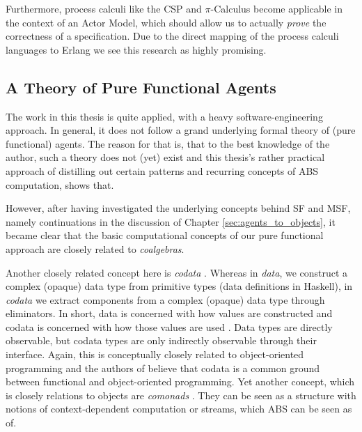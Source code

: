 Furthermore, process calculi like the CSP \cite{hoare_communicating_1985} and $\pi$-Calculus \cite{milner_communicating_1999} become applicable in the context of an Actor Model, which should allow us to actually \textit{prove} the correctness of a specification. Due to the direct mapping of the process calculi languages to Erlang we see this research as highly promising.

\subsection{A Theory of Pure Functional Agents}
The work in this thesis is quite applied, with a heavy software-engineering approach. In general, it does not follow a grand underlying formal theory of (pure functional) agents. The reason for that is, that to the best knowledge of the author, such a theory does not (yet) exist and this thesis's rather practical approach of distilling out certain patterns and recurring concepts of ABS computation, shows that.

However, after having investigated the underlying concepts behind SF and MSF, namely continuations in the discussion of Chapter \ref{sec:agents_to_objects}, it became clear that the basic computational concepts of our pure functional approach are closely related to \textit{coalgebras}. 

Another closely related concept here is \textit{codata} \cite{downen_codata_2019}. Whereas in \textit{data}, we construct a complex (opaque) data type from primitive types (data definitions in Haskell), in \textit{codata} we extract components from a complex (opaque) data type through eliminators. In short, data is concerned with how values are constructed and codata is concerned with how those values are used \cite{downen_codata_2019}. Data types are directly observable, but codata types are only indirectly observable through their interface. Again, this is conceptually closely related to object-oriented programming and the authors of \cite{downen_codata_2019} believe that codata is a common ground between functional and object-oriented programming. Yet another concept, which is closely relations to objects are \textit{comonads} \cite{uustalu_essence_2006}. They can be seen as a structure with notions of context-dependent computation or streams, which ABS can be seen as of.

